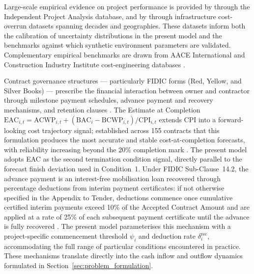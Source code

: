 Large-scale empirical evidence on project performance is provided by
\citet{Merrow2011} through the Independent Project Analysis database, and by
\citet{Flyvbjerg2003, Flyvbjerg2018} through infrastructure cost-overrun
datasets spanning decades and geographies. These datasets inform both the
calibration of uncertainty distributions in the present model and the
benchmarks against which synthetic environment parameters are validated.
Complementary empirical benchmarks are drawn from AACE International and
Construction Industry Institute cost-engineering databases
\citep{christensen1993cost}.

Contract governance structures --- particularly FIDIC forms (Red, Yellow, and
Silver Books) --- prescribe the financial interaction between owner and
contractor through milestone payment schedules, advance payment and recovery
mechanisms, and retention clauses \citep{FIDIC2017}. The Estimate at
Completion $\mathrm{EAC}_{i,t} = \mathrm{ACWP}_{i,t} + (\mathrm{BAC}_i -
\mathrm{BCWP}_{i,t})/\mathrm{CPI}_{i,t}$ extends CPI into a forward-looking
cost trajectory signal; \citet{christensen1993cost} established across 155
contracts that this formulation produces the most accurate and stable
cost-at-completion forecasts, with reliability increasing beyond the 20\%
completion mark \citep{Lipke2003}. The present model adopts EAC as the
second termination condition signal, directly parallel to the forecast finish
deviation used in Condition~1. Under FIDIC
Sub-Clause~14.2, the advance payment is an interest-free mobilisation loan
recovered through percentage deductions from interim payment certificates: if
not otherwise specified in the Appendix to Tender, deductions commence once
cumulative certified interim payments exceed 10\% of the Accepted Contract
Amount and are applied at a rate of 25\% of each subsequent payment certificate
until the advance is fully recovered \citep{FIDIC2017}. The present model
parameterises this mechanism with a project-specific commencement threshold
$\psi_i$ and deduction rate $\delta_i^{\mathrm{rec}}$, accommodating the full
range of particular conditions encountered in practice. These mechanisms translate
directly into the cash inflow and outflow dynamics formulated in
Section~\ref{sec:problem_formulation}.


